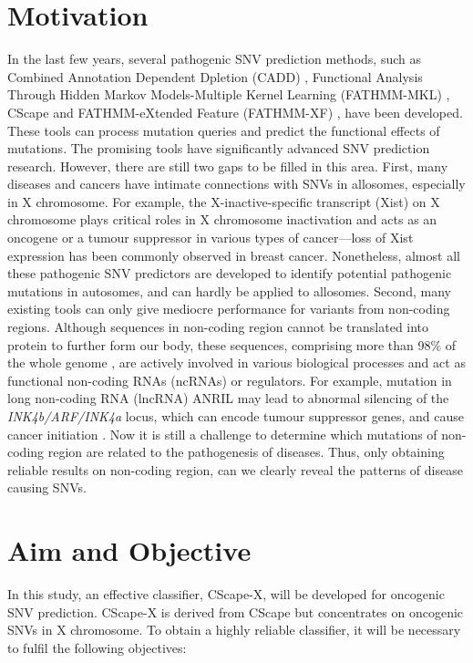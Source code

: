 \documentclass[a4paper,nohyper,nobib,openany,justified]{tufte-book}
\begin{document}
\begin{fullwidth}
\section{Motivation}

In the last few years, several pathogenic SNV prediction methods, such as Combined Annotation Dependent Dpletion (CADD) \cite{Kircher2014}, Functional Analysis Through Hidden Markov Models-Multiple Kernel Learning (FATHMM-MKL) \cite{Shihab2015}, CScape \cite{Rogers2017} and FATHMM-eXtended Feature (FATHMM-XF) \cite{Rogers2018}, have been developed. These tools can process mutation queries and predict the functional effects of mutations. The promising tools have significantly advanced SNV prediction research. However, there are still two gaps to be filled in this area. First, many diseases and cancers have intimate connections with SNVs in allosomes, especially in X chromosome. For example, the X-inactive-specific transcript (Xist) on X chromosome plays critical roles in X chromosome inactivation and acts as an oncogene or a tumour suppressor in various types of cancer---loss of Xist expression has been commonly observed in breast cancer. Nonetheless, almost all these pathogenic SNV predictors are developed to identify potential pathogenic mutations in autosomes, and can hardly be applied to allosomes. Second, many existing tools can only give mediocre performance for variants from non-coding regions. Although sequences in non-coding region cannot be translated into protein to further form our body, these sequences, comprising more than 98\% of the whole genome \cite{Djebali2012, Pennisi2012}, are actively involved in various biological processes and act as functional non-coding RNAs (ncRNAs) or regulators. For example, mutation in long non-coding RNA (lncRNA) ANRIL may lead to abnormal silencing of the \emph{INK4b/ARF/INK4a} locus, which can encode tumour suppressor genes, and cause cancer initiation \cite{Wapinski2011, Yap2010}. Now it is still a challenge to determine which mutations of non-coding region are related to the pathogenesis of diseases. Thus, only obtaining reliable results on non-coding region, can we clearly reveal the patterns of disease causing SNVs.

\section{Aim and Objective}

In this study, an effective classifier, CScape-X, will be developed for oncogenic SNV prediction. CScape-X is derived from CScape \cite{Rogers2017} but concentrates on oncogenic SNVs in X chromosome. To obtain a highly reliable classifier, it will be necessary to fulfil the following objectives:


\end{fullwidth}
\end{document}
